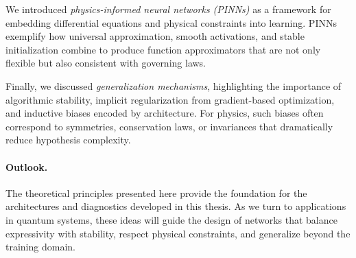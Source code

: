 We introduced \emph{physics-informed neural networks (PINNs)} as a framework 
for embedding differential equations and physical constraints into learning. 
PINNs exemplify how universal approximation, smooth activations, and stable 
initialization combine to produce function approximators that are not only 
flexible but also consistent with governing laws.  

Finally, we discussed \emph{generalization mechanisms}, highlighting the 
importance of algorithmic stability, implicit regularization from gradient-based 
optimization, and inductive biases encoded by architecture. For physics, 
such biases often correspond to symmetries, conservation laws, or invariances 
that dramatically reduce hypothesis complexity.  

\paragraph{Outlook.} 
The theoretical principles presented here provide the foundation for the 
architectures and diagnostics developed in this thesis. As we turn to 
applications in quantum systems, these ideas will guide the design of 
networks that balance expressivity with stability, respect physical 
constraints, and generalize beyond the training domain.  
